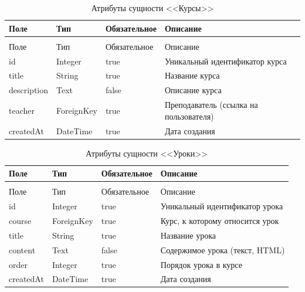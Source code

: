 \begin{xltabular}{\textwidth}{|l|l|p{3.2cm}|X|}
  \caption{Атрибуты сущности <<Курсы>>\label{courses:table}}\\ \hline
  Поле & Тип & Обязательное & Описание \\ \hline
  \endfirsthead
  \\ \hline
  Поле & Тип & Обязательное & Описание \\ \hline
  \endhead
  id & Integer & true & Уникальный идентификатор курса \\ \hline
  title & String & true & Название курса \\ \hline
  description & Text & false & Описание курса \\ \hline
  teacher & ForeignKey & true & Преподаватель (ссылка на пользователя) \\ \hline
  createdAt & DateTime & true & Дата создания \\ \hline
\end{xltabular}

\begin{xltabular}{\textwidth}{|l|l|p{3.2cm}|X|}
  \caption{Атрибуты сущности <<Уроки>>\label{lessons:table}}\\ \hline
  Поле & Тип & Обязательное & Описание \\ \hline
  \endfirsthead
  \\ \hline
  Поле & Тип & Обязательное & Описание \\ \hline
  \endhead
  id & Integer & true & Уникальный идентификатор урока \\ \hline
  course & ForeignKey & true & Курс, к которому относится урок \\ \hline
  title & String & true & Название урока \\ \hline
  content & Text & false & Содержимое урока (текст, HTML) \\ \hline
  order & Integer & true & Порядок урока в курсе \\ \hline
  createdAt & DateTime & true & Дата создания \\ \hline
\end{xltabular}

